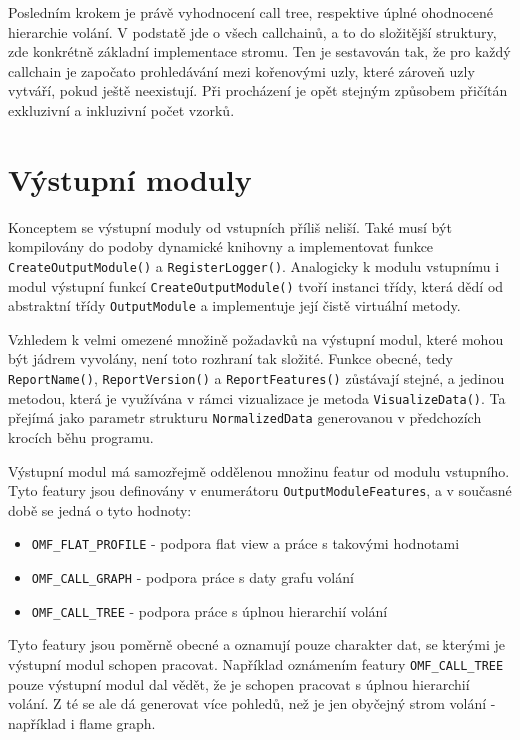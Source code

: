 \documentclass[czech,BP]{thesiskiv}
\begin{document}
Posledním krokem je právě vyhodnocení call tree, respektive úplné ohodnocené hierarchie volání. V podstatě jde o  všech callchainů, a to do složitější struktury, zde konkrétně základní implementace stromu. Ten je sestavován tak, že pro každý callchain je započato prohledávání mezi kořenovými uzly, které zároveň uzly vytváří, pokud ještě neexistují. Při procházení je opět stejným způsobem přičítán exkluzivní a inkluzivní počet vzorků.


\section{Výstupní moduly}

Konceptem se výstupní moduly od vstupních příliš neliší. Také musí být kompilovány do podoby dynamické knihovny a implementovat funkce\\ \texttt{CreateOutputModule()} a \texttt{RegisterLogger()}. Analogicky k modulu vstupnímu i modul výstupní funkcí \texttt{CreateOutputModule()} tvoří instanci třídy, která dědí od abstraktní třídy \texttt{OutputModule} a implementuje její čistě virtuální metody.

Vzhledem k velmi omezené množině požadavků na výstupní modul, které mohou být jádrem vyvolány, není toto rozhraní tak složité. Funkce obecné, tedy \texttt{ReportName()}, \texttt{ReportVersion()} a \texttt{ReportFeatures()} zůstávají stejné, a jedinou metodou, která je využívána v rámci vizualizace je metoda \texttt{VisualizeData()}. Ta přejímá jako parametr strukturu \texttt{NormalizedData} generovanou v předchozích krocích běhu programu.

Výstupní modul má samozřejmě oddělenou množinu featur od modulu vstupního. Tyto featury jsou definovány v enumerátoru \texttt{OutputModuleFeatures}, a v současné době se jedná o tyto hodnoty:

\begin{itemize}
\item \texttt{OMF\_FLAT\_PROFILE} - podpora flat view a práce s takovými hodnotami
\item \texttt{OMF\_CALL\_GRAPH} - podpora práce s daty grafu volání
\item \texttt{OMF\_CALL\_TREE} - podpora práce s úplnou hierarchií volání
\end{itemize}

Tyto featury jsou poměrně obecné a oznamují pouze charakter dat, se kterými je výstupní modul schopen pracovat. Například oznámením featury \texttt{OMF\_CALL\_TREE} pouze výstupní modul dal vědět, že je schopen pracovat s úplnou hierarchií volání. Z té se ale dá generovat více pohledů, než je jen obyčejný strom volání - například i flame graph.
\end{document}
